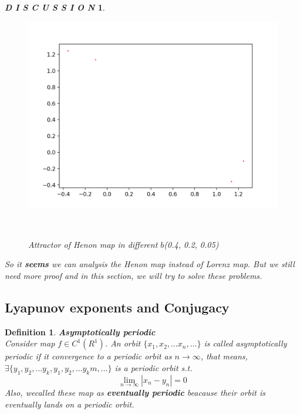 \documentclass[12pt]{article}
\theoremstyle{plain}
\newtheorem{definition}{{\color{red}\textbf{Definition}}}[section]
\newtheorem{discussion}{\textit{D I S C U S S I O N}}[section]
\begin{document}
\begin{discussion}
\begin{figure}[H]
\begin{minipage}[c][0.32\width]{0.32\textwidth}
\end{minipage}
\begin{minipage}[c][0.32\width]{0.32\textwidth}
   \centering
   \includegraphics[width=\textwidth]{figure/section2/Henon-attractor-1*2-0*05.png}
\end{minipage}
\\[3ex]\caption{Attractor of Henon map in different $b$(0.4, 0.2, 0.05)}\label{Henon-map-b}
\end{figure}



So it \textbf{seems} we can analysis the Henon map instead of Lorenz map. But we still need more proof and in this section, we will try to solve these problems.



\end{discussion}












\subsection{Lyapunov exponents and Conjugacy}

\begin{definition} \textbf{Asymptotically periodic}
\\\noindent Consider map $f \in C^1(R^1)$. An orbit $\{x_1, x_2, \ldots x_n, \ldots\}$ is called asymptotically periodic if it convergence to a periodic orbit as $n \rightarrow \infty$, that means, $\exists \{y_1, y_2, \ldots y_k, y_1, y_2, \ldots y_km ,\ldots\}$ is a periodic orbit s.t.
$$
\lim_{n \rightarrow \infty} |x_n - y_n| = 0
$$
Also, wecalled these map as \textbf{eventually periodic} beacause their orbit is eventually lands on a periodic orbit.
\end{definition} 
\end{document}
